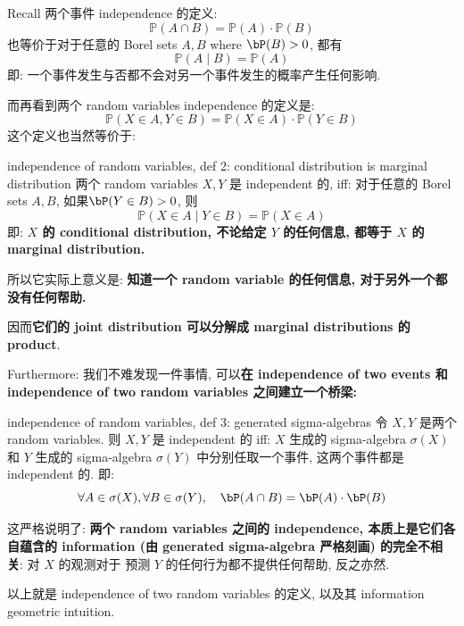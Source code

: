 \begin{remark}

Recall 两个事件 independence 的定义: 
$$ 
\mathbb{P}( A \cap B) = \mathbb{P}( A) \cdot \mathbb{P}( B)
$$
也等价于对于任意的 Borel sets \(A, B\) where \(\bP(B) > 0\), 都有
$$
\mathbb{P}( A \mid B) = \mathbb{P}( A)  
$$
即: 一个事件发生与否都不会对另一个事件发生的概率产生任何影响.


而再看到两个 random variables independence 的定义是:
$$
\mathbb{P}(X \in A, Y \in B) = \mathbb{P}(X \in A) \cdot \mathbb{P}(Y \in B)
$$
这个定义也当然等价于:
\begin{proposition}{independence of random variables, def 2: conditional distribution is marginal distribution}
两个 random variables \(X, Y\) 是 independent 的, iff: 对于任意的 Borel sets \(A, B\), 
如果\(\bP(Y \in B) > 0\), 则
$$
\mathbb{P}(X \in A \mid Y \in B) = \mathbb{P}(X \in A)  
$$
即: \textbf{\(X\) 的 conditional distribution,
 不论给定 \(Y\) 的任何信息, 都等于 \(X\) 的 marginal distribution.}
\end{proposition}

所以它实际上意义是: \textbf{知道一个 random variable 的任何信息, 对于另外一个都没有任何帮助. }

因而\textbf{它们的 joint distribution 可以分解成 marginal distributions 的 product}.\\
\end{remark}

\begin{remark}

Furthermore: 我们不难发现一件事情, 可以\textbf{在 independence 
of two events 和 independence of two random variables 之间建立一个桥梁:}
\begin{proposition}{independence of random variables, 
def 3: generated sigma-algebras}
令 \(X, Y\) 是两个 random variables. 
    则 \(X, Y\) 是 independent 的 iff:
     \(X\) 生成的 sigma-algebra \(\sigma(X)\) 和 \(Y\) 生成的 sigma-algebra 
     \(\sigma(Y)\) 中分别任取一个事件, 这两个事件都是 independent 的. 即:
$$
\forall A \in \sigma(X), \forall B \in \sigma(Y), \quad 
\bP(A \cap B) = \bP(A) \cdot \bP(B)
$$
\end{proposition}
这严格说明了: \textbf{两个 random variables 之间的 independence, 
本质上是它们各自蕴含的 information
(由 generated sigma-algebra 严格刻画) 的完全不相关}:  
对 \(X\) 的观测对于
预测 \(Y\) 的任何行为都不提供任何帮助, 反之亦然.\\
\end{remark}

以上就是 independence of two random variables 的定义, 以及其 
information geometric intuition.

